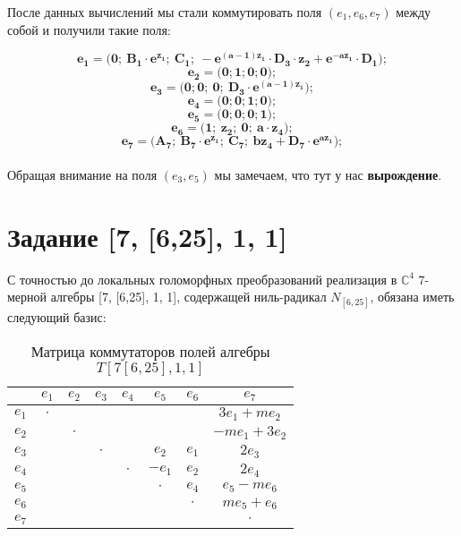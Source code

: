 \documentclass[12pt]{article}
\begin{document}
После данных вычислений мы стали коммутировать поля $(e_1, e_6, e_7)$ между собой и получили такие поля:


\[
\boldsymbol{e_1 = \big( 0;\ B_1 \cdot e^{z_1};\ C_1;\ -e^{(a-1)z_1}\cdot D_3 \cdot z_2 + e^{-az_1} \cdot D_1\big);}
\]
\[
\boldsymbol{e_2 = \big( 0; 1; 0; 0\big);}
\]
\[
\boldsymbol{e_3 = \big( 0; 0;\ 0;\ D_3\cdot e^{(a-1)z_1} \big);}
\]
\[
\boldsymbol{e_4 = \big( 0; 0; 1; 0 \big);}
\]
\[
\boldsymbol{e_5 = \big( 0; 0; 0; 1 \big);}
\]
\[
\boldsymbol{e_6 = \big( 1;\ z_2;\ 0;\ a \cdot z_4 \big);}
\]
\[
\boldsymbol{e_7 = \big( A_7;\ B_7 \cdot e^{z_1};\ C_7;\ bz_4 + D_7 \cdot e^{az_1} \big);}
\]\\
Обращая внимание на поля $(e_3, e_5)$ мы замечаем, что тут у нас \textbf{вырождение}.
\pagebreak

\section{Задание [7, [6,25], 1, 1]}

С точностью до локальных голоморфных преобразований реализация в $\mathbb{C}^4$ 7-мерной алгебры [7, [6,25], 1, 1], содержащей ниль-радикал $N_{[6,25]}$, обязана иметь следующий базис:

\begin{table}[h!]
    \centering
    \renewcommand{\arraystretch}{1.5}
    \setlength{\arrayrulewidth}{0.3mm}
    \begin{tabular}{|c|c|c|c|c|c|c|c|}
        \hline
    & $e_1$ & $e_2$ & $e_3$ & $e_4$ & $e_5$ & $e_6$ & $e_7$ \\
        \hline
        $e_1$ & $\cdot$ & & & & & & $3e_1 + me_2$\\
        \hline
        $e_2$ & & $\cdot$ & & & & & $-me_1+3e_2$\\
        \hline
        $e_3$ & & & $\cdot$ & & $e_2$ & $e_1$ & $2e_3$\\
        \hline
        $e_4$ & & & & $\cdot$ & $-e_1$ & $e_2$ & $2e_4$ \\
        \hline
        $e_5$ & & & & & $\cdot$ & $e_4$ & $e_5-me_6$ \\
        \hline
        $e_6$ & & & & & & $\cdot$ & $me_5+e_6$ \\
        \hline
        $e_7$ & & & & & & & $\cdot$ \\
        \hline
    \end{tabular}
    \caption{Матрица коммутаторов полей алгебры $T [7[6,25],1,1]$}
\end{table}
\end{document}
